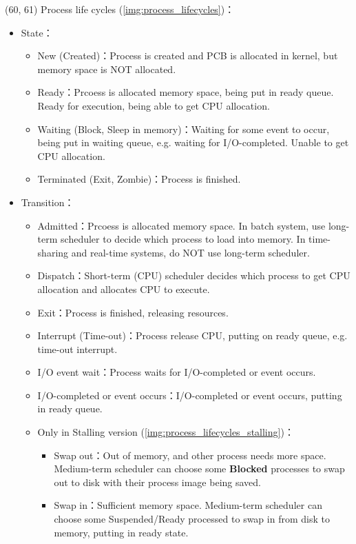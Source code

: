 \item \begin{theorem}{(60, 61)} Process life cycles (\ref{img:process_lifecycles})： \begin{itemize}
        \item State：\begin{itemize}
            \item New (Created)：Process is created and PCB is allocated in kernel, but memory space is NOT allocated.
            \item Ready：Prcoess is allocated memory space, being put in ready queue. Ready for execution, being able to get CPU allocation.
            \item Waiting (Block, Sleep in memory)：Waiting for some event to occur, being put in waiting queue, e.g. waiting for I/O-completed. Unable to get CPU allocation.
            \item Terminated (Exit, Zombie)：Process is finished.
        \end{itemize}
        \item Transition：\begin{itemize}
            \item Admitted：Prcoess is allocated memory space. In batch system, use long-term scheduler to decide which process to load into memory. In time-sharing and real-time systems, do NOT use long-term scheduler.
            \item Dispatch：Short-term (CPU) scheduler decides which process to get CPU allocation and allocates CPU to execute.
            \item Exit：Process is finished, releasing resources.
            \item Interrupt (Time-out)：Process release CPU, putting on ready queue, e.g. time-out interrupt.
            \item I/O event wait：Process waits for I/O-completed or event occurs.
            \item I/O-completed or event occurs：I/O-completed or event occurs, putting in ready queue.
            \item Only in Stalling version (\ref{img:process_lifecycles_stalling})：\begin{itemize}
                \item Swap out：Out of memory, and other process needs more space. Medium-term scheduler can choose some \textbf{Blocked} processes to swap out to disk with their process image being saved.
                \item Swap in：Sufficient memory space. Medium-term scheduler can choose some Suspended/Ready processed to swap in from disk to memory, putting in ready state.

\end{itemize}
\end{itemize}
\end{itemize}
\end{theorem}
